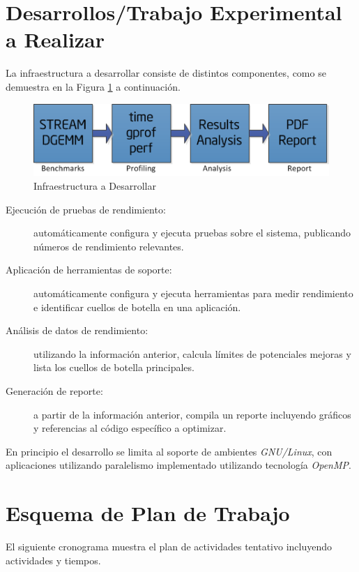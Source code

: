 \documentclass[a4paper]{article}
\begin{document}
\section{Desarrollos/Trabajo Experimental a Realizar}

La infraestructura a desarrollar consiste de distintos componentes, como se demuestra en la Figura \ref{fig:framework} a continuación.

\begin{figure}[H]
\centering
\includegraphics{framework.png}
\caption{Infraestructura a Desarrollar}
\label{fig:framework}
\end{figure}

  \begin{description}
  \item[Ejecución de pruebas de rendimiento:] automáticamente configura y ejecuta pruebas sobre el sistema, publicando números de rendimiento relevantes.
  \item[Aplicación de herramientas de soporte:] automáticamente configura y ejecuta herramientas para medir rendimiento e identificar cuellos de botella en una aplicación.
  \item[Análisis de datos de rendimiento:] utilizando la información anterior, calcula límites de potenciales mejoras y lista los cuellos de botella principales.
  \item[Generación de reporte:] a partir de la información anterior, compila un reporte incluyendo gráficos y referencias al código específico a optimizar.
  \end{description}

En principio el desarrollo se limita al soporte de ambientes {\it GNU/Linux}, con aplicaciones utilizando paralelismo implementado utilizando tecnología {\it OpenMP}.

\section{Esquema de Plan de Trabajo}

El siguiente cronograma muestra el plan de actividades tentativo incluyendo actividades y tiempos.
\end{document}
